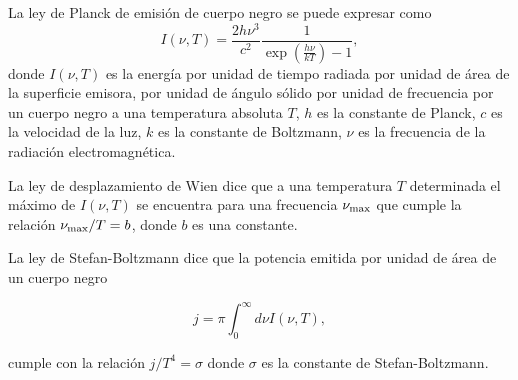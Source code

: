 \documentclass[11pt,letterpaper]{exam}
\begin{document}
\begin{questions}


La ley de Planck de emisi\'on de cuerpo negro se puede expresar como
\begin{equation}
I(\nu, T) = \frac{2h\nu^3}{c^2}\frac{1}{\exp\left(\frac{h\nu}{kT}\right)-1}, 
\end{equation}
%
donde $I(\nu, T)$  es la energ\'ia por unidad de tiempo radiada por
unidad de \'area de la superficie emisora, por unidad de \'angulo
s\'olido por unidad de frecuencia por un cuerpo negro a una
temperatura absoluta $T$, $h$ es la constante de Planck, $c$ es la velocidad de
la luz, $k$ es la constante de Boltzmann, $\nu$ es la frecuencia de la
radiaci\'on electromagn\'etica.

La ley de desplazamiento de Wien dice que a una temperatura $T$
determinada el m\'aximo de $I(\nu, T)$ se encuentra para una
frecuencia $\nu_{\rm max}$ que cumple la relaci\'on $\nu_{\rm
  max}/T=b$, donde $b$ es una constante.  

La ley de Stefan-Boltzmann dice que la potencia emitida por unidad de
\'area de un cuerpo negro

\begin{equation}
j = \pi \int_{0}^{\infty}d\nu I(\nu,T),
\end{equation}

cumple con la relaci\'on $j/T^4 =\sigma$ donde $\sigma$ es la
constante de Stefan-Boltzmann.

\end{questions}
\end{document}
